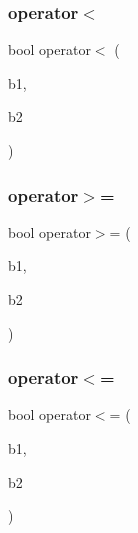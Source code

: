 \mbox{\label{class_a_e_s_byte_a24de3dafa3bf5c617366f83099a15656}} 
\subsubsection{\texorpdfstring{operator$<$}{operator<}}
{\footnotesize\ttfamily bool operator$<$ (\begin{DoxyParamCaption}\item[{const \mbox{\hyperlink{class_a_e_s_byte}{A\+E\+S\+Byte}} \&}]{b1,  }\item[{const \mbox{\hyperlink{class_a_e_s_byte}{A\+E\+S\+Byte}} \&}]{b2 }\end{DoxyParamCaption})\hspace{0.3cm}{\ttfamily [friend]}}

\mbox{\label{class_a_e_s_byte_a676c2c24ecb18ec4ae60623d21ad72c5}} 
\subsubsection{\texorpdfstring{operator$>$=}{operator>=}}
{\footnotesize\ttfamily bool operator$>$= (\begin{DoxyParamCaption}\item[{const \mbox{\hyperlink{class_a_e_s_byte}{A\+E\+S\+Byte}} \&}]{b1,  }\item[{const \mbox{\hyperlink{class_a_e_s_byte}{A\+E\+S\+Byte}} \&}]{b2 }\end{DoxyParamCaption})\hspace{0.3cm}{\ttfamily [friend]}}

\mbox{\label{class_a_e_s_byte_ae9209fb9b57d49998d15961f356cd351}} 
\subsubsection{\texorpdfstring{operator$<$=}{operator<=}}
{\footnotesize\ttfamily bool operator$<$= (\begin{DoxyParamCaption}\item[{const \mbox{\hyperlink{class_a_e_s_byte}{A\+E\+S\+Byte}} \&}]{b1,  }\item[{const \mbox{\hyperlink{class_a_e_s_byte}{A\+E\+S\+Byte}} \&}]{b2 }\end{DoxyParamCaption})\hspace{0.3cm}{\ttfamily [friend]}}

